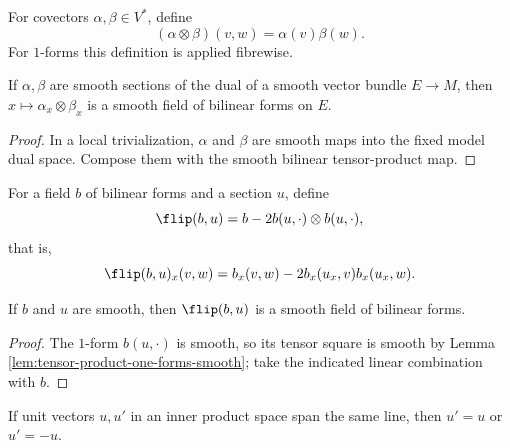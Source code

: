 \begin{definition}
\label{def:tensor-product-one-forms}
\leanok
For covectors $\alpha,\beta\in V^*$, define
\[
(\alpha\otimes\beta)(v,w)=\alpha(v)\beta(w).
\]
For $1$-forms this definition is applied fibrewise.
\end{definition}

\begin{lemma}
\label{lem:tensor-product-one-forms-smooth}
\leanok
{}
If $\alpha,\beta$ are smooth sections of the dual of a smooth vector bundle
$E\to M$, then $x\mapsto\alpha_x\otimes\beta_x$ is a smooth field of bilinear
forms on $E$.
\end{lemma}

\begin{proof}
\leanok
{}
\sketch In a local trivialization, $\alpha$ and $\beta$ are smooth maps into the
fixed model dual space. Compose them with the smooth bilinear tensor-product map.
\end{proof}

\begin{definition}
\label{def:sign-flipped-form}
\leanok
{}
For a field $b$ of bilinear forms and a section $u$, define
\[
\flip(b,u)=b-2b(u,\cdot)\otimes b(u,\cdot),
\]
that is,
\[
\flip(b,u)_x(v,w)=b_x(v,w)-2b_x(u_x,v)b_x(u_x,w).
\]
\end{definition}

\begin{lemma}
\label{lem:sign-flipped-form-smooth}
\leanok
{}
If $b$ and $u$ are smooth, then $\flip(b,u)$ is a smooth field of bilinear forms.
\end{lemma}

\begin{proof}
\leanok
{}
\sketch The $1$-form $b(u,\cdot)$ is smooth, so its tensor square is smooth by
Lemma \ref{lem:tensor-product-one-forms-smooth}; take the indicated linear
combination with $b$.
\end{proof}

\begin{lemma}
\label{lem:two-unit-vectors-of-a-line}
\leanok
If unit vectors $u,u'$ in an inner product space span the same line, then
$u'=u$ or $u'=-u$.
\end{lemma}

